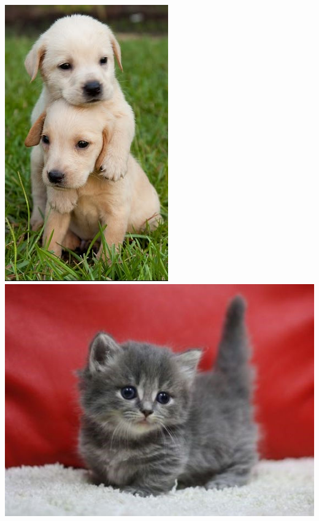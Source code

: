 \documentclass[a4paper]{exam}
\theoremstyle{claim}
\begin{document}
\begin{center}
  \includegraphics[scale = 0.4]{puppy.jpeg}
  \includegraphics[scale  = 0.425]{kitten.jpeg}
\end{center}
\end{document}
